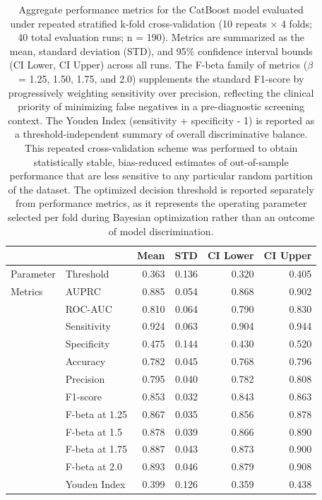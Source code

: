 \documentclass[pdflatex,sn-vancouver-num]{sn-jnl}
\begin{document}
\begin{table}[t]
\centering
\footnotesize
\begin{tabular}{llrrrr}
\toprule
&  & Mean & STD & CI Lower & CI Upper \\
\midrule
Parameter & Threshold & 0.363 & 0.136 & 0.320 & 0.405 \\
\midrule
Metrics &  AUPRC & 0.885 & 0.054 & 0.868 & 0.902 \\
& ROC-AUC & 0.810 & 0.064 & 0.790 & 0.830 \\
& Sensitivity & 0.924 & 0.063 & 0.904 & 0.944 \\
& Specificity & 0.475 & 0.144 & 0.430 & 0.520 \\
& Accuracy & 0.782 & 0.045 & 0.768 & 0.796 \\
& Precision & 0.795 & 0.040 & 0.782 & 0.808 \\
& F1-score & 0.853 & 0.032 & 0.843 & 0.863 \\
& F-beta at 1.25 & 0.867 & 0.035 & 0.856 & 0.878 \\
& F-beta at 1.5 & 0.878 & 0.039 & 0.866 & 0.890 \\
& F-beta at 1.75 & 0.887 & 0.043 & 0.873 & 0.900 \\
& F-beta at 2.0 & 0.893 & 0.046 & 0.879 & 0.908 \\
& Youden Index & 0.399 & 0.126 & 0.359 & 0.438 \\
\bottomrule
\end{tabular}


\caption{Aggregate performance metrics for the CatBoost model evaluated under repeated stratified k-fold cross-validation (10 repeats × 4 folds; 40 total evaluation runs; n = 190). Metrics are summarized as the mean, standard deviation (STD), and 95\% confidence interval bounds (CI Lower, CI Upper) across all runs. The F-beta family of metrics ($\beta$ = 1.25, 1.50, 1.75, and 2.0) supplements the standard F1-score by progressively weighting sensitivity over precision, reflecting the clinical priority of minimizing false negatives in a pre-diagnostic screening context. The Youden Index (sensitivity + specificity - 1) is reported as a threshold-independent summary of overall discriminative balance. This repeated cross-validation scheme was performed to obtain statistically stable, bias-reduced estimates of out-of-sample performance that are less sensitive to any particular random partition of the dataset. The optimized decision threshold is reported separately from performance metrics, as it represents the operating parameter selected per fold during Bayesian optimization rather than an outcome of model discrimination.}
\label{tab:rkfold}
\end{table}
\end{document}
